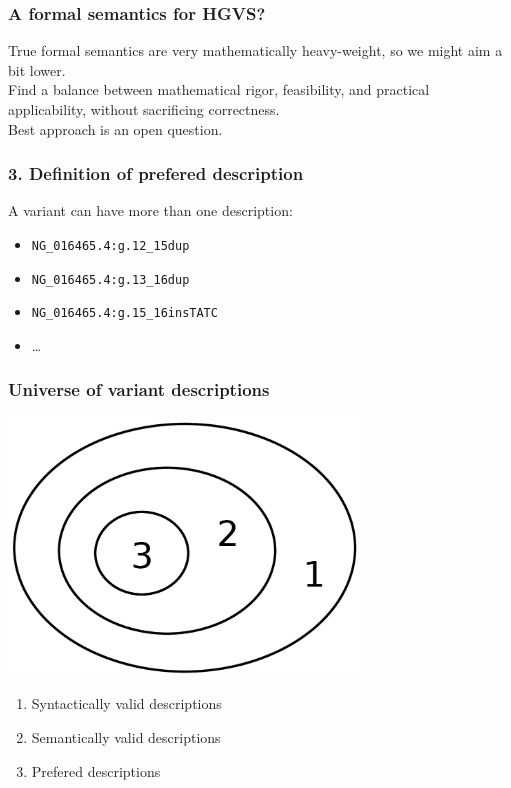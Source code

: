 \documentclass[14pt]{beamer}
\begin{document}
\begin{frame}
  \frametitle{A formal semantics for \textcolor{hgvs}{HGVS}?}

  True formal semantics are very mathematically heavy-weight, so we might aim
  a bit lower.\\[2em]

  Find a balance between mathematical rigor, feasibility, and practical
  applicability, without sacrificing correctness.\\[2em]

  \pause
  Best approach is an open question.
\end{frame}


\begin{frame}[fragile]
  \frametitle{3. Definition of prefered description}

  A variant can have more than one description:
  \begin{itemize}[<+->]
    \item \verb|NG_016465.4:g.12_15dup|
    \item \verb|NG_016465.4:g.13_16dup|
    \item \verb|NG_016465.4:g.15_16insTATC|
    \item \ldots\\[2em]
  \end{itemize}

\end{frame}


\begin{frame}[fragile]
  \frametitle{Universe of variant descriptions}
  \begin{center}
    \includegraphics[width=0.7\textwidth]{pictures/descriptions.png}
  \end{center}
  \begin{enumerate}
    \item Syntactically valid descriptions
    \item Semantically valid descriptions
    \item Prefered descriptions
  \end{enumerate}
\end{frame}
\end{document}

